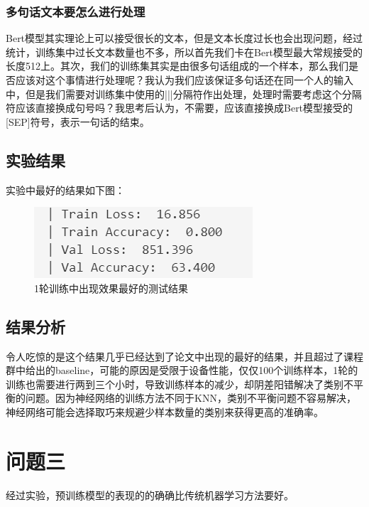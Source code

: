 \documentclass{article}
\begin{document}
	\subsubsection{多句话文本要怎么进行处理}
	Bert模型其实理论上可以接受很长的文本，但是文本长度过长也会出现问题，经过统计，训练集中过长文本数量也不多，所以首先我们卡在Bert模型最大常规接受的长度512上。其次，我们的训练集其实是由很多句话组成的一个样本，那么我们是否应该对这个事情进行处理呢？我认为我们应该保证多句话还在同一个人的输入中，但是我们需要对训练集中使用的|||分隔符作出处理，处理时需要考虑这个分隔符应该直接换成句号吗？我思考后认为，不需要，应该直接换成Bert模型接受的[SEP]符号，表示一句话的结束。
	\subsection{实验结果}
	实验中最好的结果如下图：
	\begin{figure}[H]
		\centering
		\includegraphics[width=0.618\textheight]{2}
		\caption{1轮训练中出现效果最好的测试结果}
	\end{figure}
	\subsection{结果分析}
	令人吃惊的是这个结果几乎已经达到了论文中出现的最好的结果，并且超过了课程群中给出的baseline，可能的原因是受限于设备性能，仅仅100个训练样本，1轮的训练也需要进行两到三个小时，导致训练样本的减少，却阴差阳错解决了类别不平衡的问题。因为神经网络的训练方法不同于KNN，类别不平衡问题不容易解决，神经网络可能会选择取巧来规避少样本数量的类别来获得更高的准确率。
	\section{问题三}
	经过实验，预训练模型的表现的的确确比传统机器学习方法要好。
	
\end{document}
